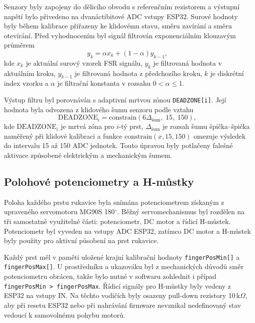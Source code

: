 \documentclass[FZS,DP]{tulthesis}
\begin{document}
Senzory byly zapojeny do dělicího obvodu s referenčním rezistorem a výstupní napětí bylo přivedeno na dvanáctibitové ADC vstupy ESP32. Surové hodnoty byly během kalibrace přiřazeny ke klidovému stavu, směru zavírání a směru otevírání. Před vyhodnocením byl signál filtrován exponenciálním klouzavým průměrem
\begin{equation}
y_k = \alpha x_k + \left(1 - \alpha\right)y_{k-1},
\end{equation}
kde $x_k$ je aktuální surový vzorek FSR signálu, $y_k$ je filtrovaná
hodnota v aktuálním kroku, $y_{k-1}$ je filtrovaná hodnota z předchozího
kroku, $k$ je diskrétní index vzorku a $\alpha$ je filtrační konstanta
v rozsahu $0<\alpha\leq 1$.

Výstup filtru byl porovnáván s adaptivní mrtvou zónou \texttt{DEADZONE[i]}. Její hodnota byla odvozena z klidového šumu senzoru podle vztahu
\begin{equation}
\mathrm{DEADZONE}_i =
\mathrm{constrain}\left(6\Delta_{\mathrm{šum}},\;15,\;150\right),
\end{equation}
kde $\mathrm{DEADZONE}_i$ je mrtvá zóna pro $i$-tý prst,
$\Delta_{\mathrm{šum}}$ je rozsah šumu špička--špička naměřený při
klidové kalibraci a funkce $\mathrm{constrain}(x,15,150)$ omezuje
výsledek do intervalu 15 až 150 ADC jednotek. Touto úpravou byly potlačeny falešné aktivace způsobené elektrickým a mechanickým šumem.

\subsection{Polohové potenciometry a H-můstky}
\label{subsec:potenciometry-hmustky}

Poloha každého prstu rukavice byla snímána potenciometrem získaným z upraveného servomotoru MG90S 180$^\circ$. Běžný servomechanismus byl rozdělen na tři samostatně využitelné části: potenciometr, DC motor a řídicí H-můstek. Potenciometr byl vyveden na vstupy ADC ESP32, zatímco DC motor a H-můstek byly použity pro aktivní působení na prst rukavice.

Každý prst měl v paměti uložené krajní kalibrační hodnoty \texttt{fingerPosMin[]} a \texttt{fingerPosMax[]}. U prostředníku a ukazováku byl z mechanických důvodů směr potenciometru obrácen, takže bylo nutné v softwaru zohlednit i případ \texttt{fingerPosMin > fingerPosMax}. Řídicí signály pro H-můstky byly vedeny z ESP32 na vstupy IN\@. Na těchto vodičích byly osazeny pull-down rezistory 10\,k$\Omega$, aby při resetu ESP32 nebo při nahrávání firmware nevznikal nedefinovaný stav vedoucí k samovolnému pohybu motorů.
\end{document}
